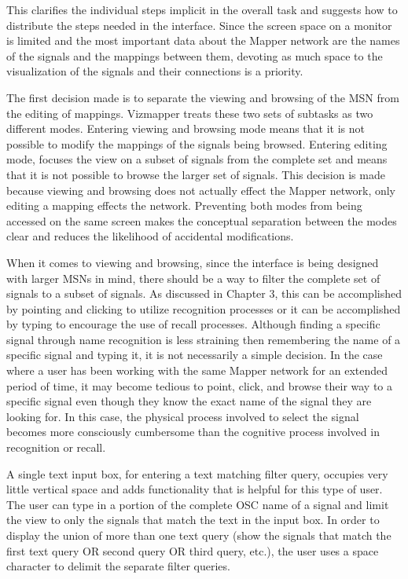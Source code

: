 This clarifies the individual steps implicit in the overall task and suggests how to distribute the steps needed in the interface. Since the screen space on a monitor is limited and the most important data about the Mapper network are the names of the signals and the mappings between them, devoting as much space to the visualization of the signals and their connections is a priority.

The first decision made is to separate the viewing and browsing of the MSN from the editing of mappings. Vizmapper treats these two sets of subtasks as two different modes. Entering viewing and browsing mode means that it is not possible to modify the mappings of the signals being browsed. Entering editing mode, focuses the view on a subset of signals from the complete set and means that it is not possible to browse the larger set of signals. This decision is made because viewing and browsing does not actually effect the Mapper network, only editing a mapping effects the network. Preventing both modes from being accessed on the same screen makes the conceptual separation between the modes clear and reduces the likelihood of accidental modifications.

When it comes to viewing and browsing, since the interface is being designed with larger MSNs in mind, there should be a way to filter the complete set of signals to a subset of signals. As discussed in Chapter 3, this can be accomplished by pointing and clicking to utilize recognition processes or it can be accomplished by typing to encourage the use of recall processes. Although finding a specific signal through name recognition is less straining then remembering the name of a specific signal and typing it, it is not necessarily a simple decision. In the case where a user has been working with the same Mapper network for an extended period of time, it may become tedious to point, click, and browse their way to a specific signal even though they know the exact name of the signal they are looking for. In this case, the physical process involved to select the signal becomes more consciously cumbersome than the cognitive process involved in recognition or recall.

A single text input box, for entering a text matching filter query, occupies very little vertical space and adds functionality that is helpful for this type of user. The user can type in a portion of the complete OSC name of a signal and limit the view to only the signals that match the text in the input box. In order to display the union of more than one text query (show the signals that match the first text query OR second query OR third query, etc.), the user uses a space character to delimit the separate filter queries. 

